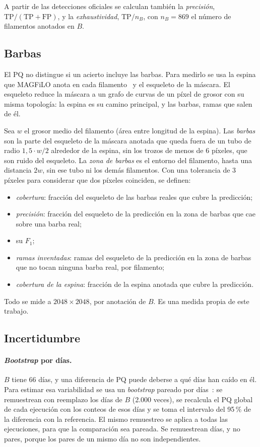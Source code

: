 A partir de las detecciones oficiales se calculan también la
\emph{precisión}, $\mathrm{TP}/(\mathrm{TP}+\mathrm{FP})$, y la
\emph{exhaustividad}, $\mathrm{TP}/n_B$, con $n_B=869$ el número de
filamentos anotados en $B$.

\subsection{Barbas}

El PQ no distingue si un acierto incluye las barbas. Para medirlo se usa
la espina que MAGFiLO anota en cada filamento~\cite{ahmadzadeh2024} y el
esqueleto de la máscara. El esqueleto reduce la máscara a un grafo de
curvas de un píxel de grosor con su misma topología: la espina es su
camino principal, y las barbas, ramas que salen de él.

Sea $w$ el grosor medio del filamento (área entre longitud de la
espina). Las \emph{barbas} son la parte del esqueleto de la máscara
anotada que queda fuera de un tubo de radio $1{,}5\cdot w/2$ alrededor de
la espina, sin los trozos de menos de 6 píxeles, que son ruido del
esqueleto. La \emph{zona de barbas} es el entorno del filamento, hasta
una distancia $2w$, sin ese tubo ni los demás filamentos. Con una
tolerancia de 3 píxeles para considerar que dos píxeles coinciden, se
definen:
\begin{itemize}
  \item \emph{cobertura}: fracción del esqueleto de las barbas reales
  que cubre la predicción;
  \item \emph{precisión}: fracción del esqueleto de la predicción en la
  zona de barbas que cae sobre una barba real;
  \item su $F_1$;
  \item \emph{ramas inventadas}: ramas del esqueleto de la predicción en
  la zona de barbas que no tocan ninguna barba real, por filamento;
  \item \emph{cobertura de la espina}: fracción de la espina anotada que
  cubre la predicción.
\end{itemize}
Todo se mide a $2048\times2048$, por anotación de $B$. Es una medida
propia de este trabajo.

\subsection{Incertidumbre}

\paragraph{\emph{Bootstrap} por días.} $B$ tiene 66 días, y una
diferencia de PQ puede deberse a qué días han caído en él. Para estimar
esa variabilidad se usa un \emph{bootstrap} pareado por
días~\cite{efron1993}: se remuestrean con reemplazo los días de $B$
(2.000 veces), se recalcula el PQ global de cada ejecución con los
conteos de esos días y se toma el intervalo del 95\,\% de la diferencia
con la referencia. El mismo remuestreo se aplica a todas las
ejecuciones, para que la comparación sea pareada. Se remuestrean días, y
no pares, porque los pares de un mismo día no son independientes.

